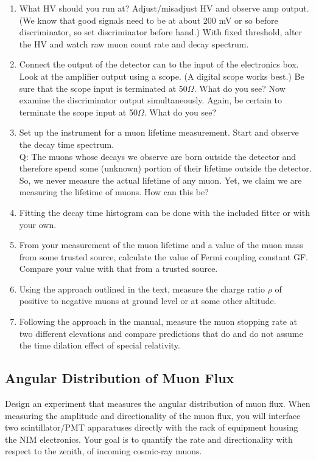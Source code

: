 \documentclass[aps,prb,groupedaddress,notitlepage,nofootinbib]{revtex4-1} %
\begin{document}
\begin{enumerate}
\item What HV should you run at? Adjust/misadjust HV and observe amp output. (We know
that good signals need to be at about 200 mV or so before discriminator, so set
discriminator before hand.) With fixed threshold, alter the HV and watch raw muon count
rate and decay spectrum.
\item Connect the output of the detector can to the input of the electronics box. Look at the
amplifier output using a scope. (A digital scope works best.) Be sure that the scope
input is terminated at 50$\Omega$. What do you see? Now examine the discriminator
output simultaneously. Again, be certain to terminate the scope input at 50$\Omega$. What do
you see?
\item Set up the instrument for a muon lifetime measurement.
 Start and observe the decay time spectrum.\\
 Q: The muons whose decays we observe are born outside the detector and therefore
spend some (unknown) portion of their lifetime outside the detector. So, we never
measure the actual lifetime of any muon. Yet, we claim we are measuring the lifetime of
muons. How can this be?
\item Fitting the decay time histogram can be done with the included fitter or with your own.
\item From your measurement of the muon lifetime and a value of the muon mass from
some trusted source, calculate the value of Fermi coupling constant GF. Compare your
value with that from a trusted source.
\item Using the approach outlined in the text, measure the charge ratio $\rho$ of positive to
negative muons at ground level or at some other altitude.
\item Following the approach in the manual, measure the muon stopping rate at two
different elevations and compare predictions that do and do not assume the time dilation
effect of special relativity. 
\end{enumerate}
\subsection{Angular Distribution of Muon Flux}
Design an experiment that measures the angular distribution of muon flux.
When measuring the amplitude and directionality of the muon flux, you will interface two scintillator/PMT apparatuses directly with the rack of equipment housing the NIM electronics. Your goal is to quantify the rate and directionality with respect to the zenith, of incoming cosmic-ray muons. 
\end{document}
